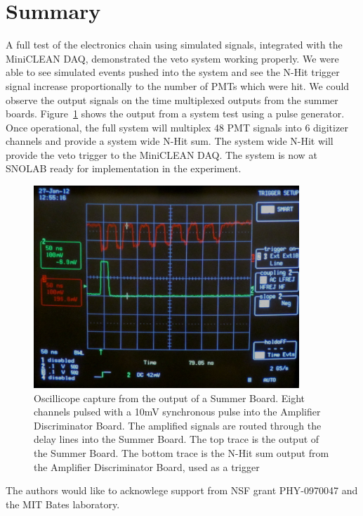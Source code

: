 \documentclass{JINST}
\begin{document}
\section{Summary}
\label{Summary}
%
A full test of the electronics chain using simulated signals,
integrated with the MiniCLEAN DAQ, demonstrated the veto
system working properly.  We were able to see simulated events pushed
into the system and see the N-Hit trigger signal increase
proportionally to the number of PMTs which were hit.  We could observe
the output signals on the time multiplexed outputs from the summer
boards.  Figure~\ref{fig:multipulse} shows the output from a system
test using a pulse generator.  Once operational, the full system will
multiplex 48 PMT signals into 6 digitizer channels and provide a
system wide N-Hit sum.  The system wide N-Hit will provide the veto
trigger to the MiniCLEAN DAQ.  The system is now at SNOLAB ready for
implementation in the experiment.

\begin{figure}[ht]
\begin{center}
\includegraphics[height=3in, keepaspectratio=true]{graphics/delaypulse.jpg}
\caption{Oscillicope capture from the output of a Summer Board.  Eight channels pulsed with a 10mV synchronous pulse into the Amplifier Discriminator Board.  The amplified signals are routed through the delay lines into the Summer Board.  The top trace is the output of the Summer Board.  The bottom trace is the N-Hit sum output from the Amplifier Discriminator Board, used as a trigger
\label{fig:multipulse}}
\end{center}
\end{figure}

\acknowledgments
The authors would like to acknowlege support from NSF grant PHY-0970047 and the MIT Bates laboratory.
\end{document}
